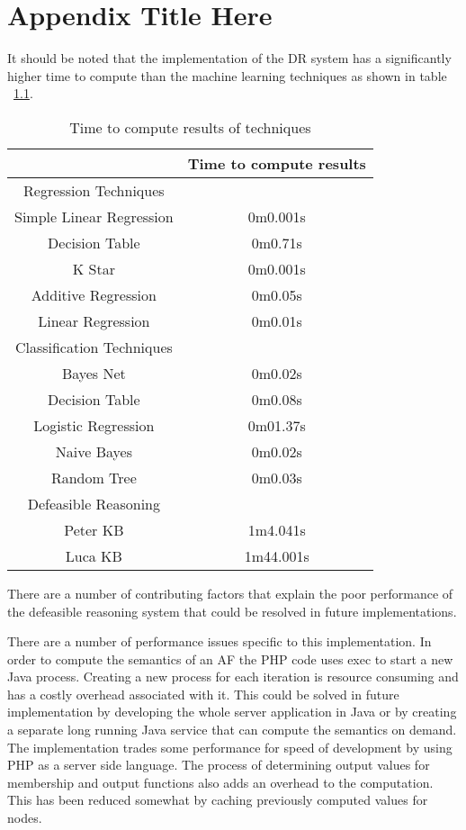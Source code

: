 
\chapter{Appendix Title Here} %

\label{AppendixB} %


It should be noted that the implementation of the DR system has a significantly higher time to compute than the machine learning techniques as shown in table ~\ref{tab:timeperformance}.

\begin{table}[!htbp]
\centering
\begin{tabular}{|c|c|}
\hline
 & Time to compute results \\ \hline
Regression Techniques & \\ \hline
Simple Linear Regression & 0m0.001s\\
Decision Table & 0m0.71s\\
K Star & 0m0.001s\\
Additive Regression & 0m0.05s\\
Linear Regression & 0m0.01s\\ \hline
Classification Techniques & \\ \hline
Bayes Net &0m0.02s \\
Decision Table & 0m0.08s\\  
Logistic Regression & 0m01.37s\\ 
Naive Bayes & 0m0.02s\\ 
Random Tree & 0m0.03s\\ \hline
Defeasible Reasoning & \\ \hline
Peter KB & 1m4.041s\\
Luca KB & 1m44.001s\\
\hline
\end{tabular}
\caption{Time to compute results of techniques}
\label{tab:timeperformance}
\end{table}

There are a number of contributing factors that explain the poor performance of the defeasible reasoning system that could be resolved in future implementations. 

There are a number of performance issues specific to this implementation. In order to compute the semantics of an AF the PHP code uses exec to start a new Java process. Creating a new process for each iteration is resource consuming and has a costly overhead associated with it. This could be solved in future implementation by developing the whole server application in Java or by creating a separate long running Java service that can compute the semantics on demand. The implementation trades some performance for speed of development by using PHP as a server side language. The process of determining output values for membership and output functions also adds an overhead to the computation. This has been reduced somewhat by caching previously computed values for nodes. 

